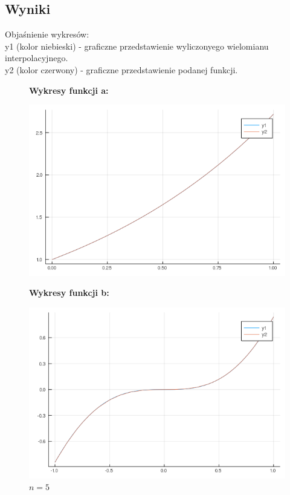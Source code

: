 \documentclass[11pt, a4paper]{article}
\begin{document}
    \subsection{Wyniki}
    Objaśnienie wykresów:\\
    y1 (kolor niebieski) - graficzne przedstawienie wyliczonyego wielomianu interpolacyjnego.\\
    y2 (kolor czerwony) - graficzne przedstawienie podanej funkcji.
    \begin{figure}[H]
        \captionsetup{labelformat = empty}
        \begin{minipage}{0.5\textwidth}
            \centerline{\textbf{Wykresy funkcji a:}}
            \caption{$n=5$}
            \centering
            \includegraphics[width=\linewidth]{plot-5_a_n5}
        \end{minipage}
        \begin{minipage}{0.5\textwidth}
            \centerline{\textbf{Wykresy funkcji b:}}
            \caption{$n=5$}
            \centering
            \includegraphics[width=\linewidth]{plot-5_b_n5}
        \end{minipage}


\end{figure}
\end{document}
